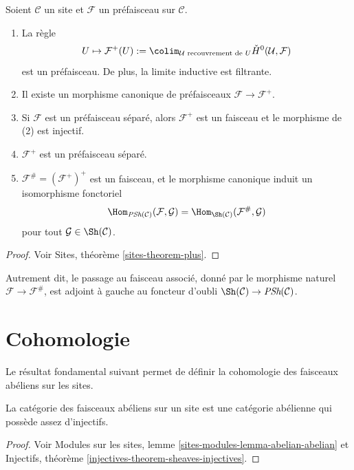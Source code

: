 \begin{theorem}
\label{theorem-sheafification}
Soient $\mathcal{C}$ un site et $\mathcal{F}$ un pr\'efaisceau sur $\mathcal{C}$.
\begin{enumerate}
\item La r\`egle
$$
U \mapsto \mathcal{F}^+(U) :=
\colim_{\mathcal{U} \text{ recouvrement de }U}
\check H^0(\mathcal{U}, \mathcal{F})
$$
est un pr\'efaisceau. De plus, la limite inductive est filtrante.
\item Il existe un morphisme canonique de pr\'efaisceaux $\mathcal{F} \to \mathcal{F}^+$.
\item Si $\mathcal{F}$ est un pr\'efaisceau s\'epar\'e, alors $\mathcal{F}^+$ est un faisceau
et le morphisme de (2) est injectif.
\item $\mathcal{F}^+$ est un pr\'efaisceau s\'epar\'e.
\item $\mathcal{F}^\# = (\mathcal{F}^+)^+$ est un faisceau, et le morphisme canonique
induit un isomorphisme fonctoriel
$$
\Hom_{\textit{PSh}(\mathcal{C})}(\mathcal{F}, \mathcal{G}) =
\Hom_{\Sh(\mathcal{C})}(\mathcal{F}^\#, \mathcal{G})
$$
pour tout $\mathcal{G} \in \Sh(\mathcal{C})$.
\end{enumerate}
\end{theorem}

\begin{proof}
Voir Sites, th\'eor\`eme \ref{sites-theorem-plus}.
\end{proof}

\noindent
Autrement dit, le passage au faisceau associ\'e, donn\'e par le morphisme naturel
$\mathcal{F} \to \mathcal{F}^\#$, est adjoint \`a gauche au foncteur d'oubli
$\Sh(\mathcal{C}) \to \textit{PSh}(\mathcal{C})$.




\section{Cohomologie}
\label{section-cohomology}

\noindent
Le r\'esultat fondamental suivant permet de d\'efinir la cohomologie
des faisceaux ab\'eliens sur les sites.

\begin{theorem}
\label{theorem-enough-injectives}
La cat\'egorie des faisceaux ab\'eliens sur un site est une cat\'egorie ab\'elienne
qui poss\`ede assez d'injectifs.
\end{theorem}

\begin{proof}
Voir
Modules sur les sites, lemme \ref{sites-modules-lemma-abelian-abelian} et
Injectifs, th\'eor\`eme \ref{injectives-theorem-sheaves-injectives}.
\end{proof}

